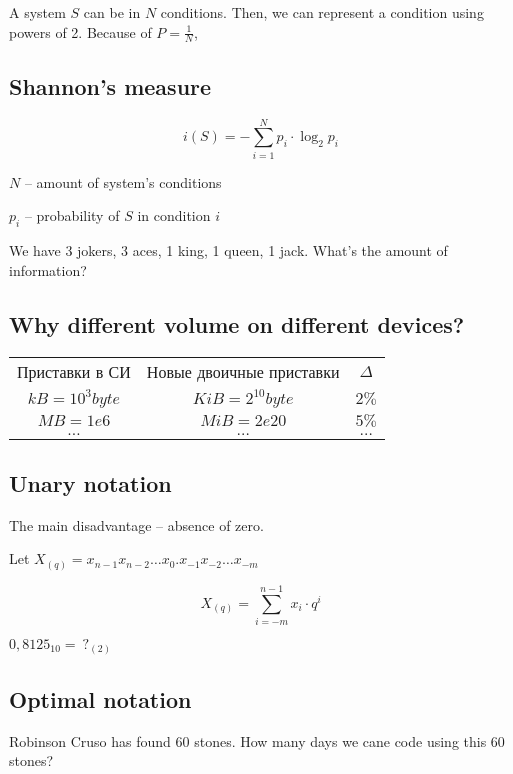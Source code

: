 A system $S$ can be in $N$ conditions. Then, we can represent a condition using powers of 2. Because of  $P = \frac{1}{N}$, 

\subsection{Shannon's measure}

\[
	i(S) = -\sum_{i = 1}^{N} p_{i} \cdot \log_2 p_{i}
\]

$N$ -- amount of system's conditions

$p_i$ -- probability of $S$ in condition $i$ 

\begin{example}[]
	We have 3 jokers, 3 aces, 1 king, 1 queen, 1 jack. What's the amount of information?
\end{example}

\subsection{Why different volume on different devices?}

\begin{center}
	\begin{tabular}{|c|c|c|}
		 Приставки в СИ & Новые двоичные приставки  & $\Delta$\\
		$kB = 10^{3} byte$ & $KiB = 2^{10} byte$ & $2\%$ \\
		$MB = 1e 6$ & $MiB = 2e 20$ & $5\%$ \\
		$ \dots $ & $ \dots $ & $ \dots $ \\
	\end{tabular}
\end{center}

\subsection{Unary notation}

The main disadvantage -- absence of zero.

Let $X_{(q)} = x_{n-1}x_{n-2} \dots x_0. x_{-1}x_{-2} \dots x_{-m}$

\[
	X_{(q)} = \sum_{i = -m}^{n-1} x_i \cdot q^{i}
\]

\begin{problem}[]
	$0,8125_{10} = \ ?_{(2)}$
\end{problem}


\subsection{Optimal notation}
\begin{problem}[]
	Robinson Cruso has found 60 stones. How many days we cane code using this 60 stones?
\end{problem}

